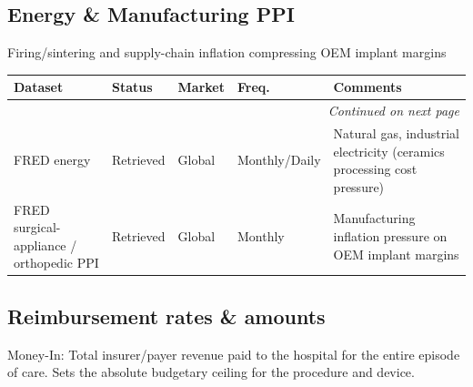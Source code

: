 \documentclass{article}
\begin{document}
\subsection{Energy \& Manufacturing PPI}
Firing/sintering and supply-chain inflation compressing OEM implant margins\\[0.5em]

\small
\setlength{\tabcolsep}{4pt}
\renewcommand{\arraystretch}{1.15}
\begin{longtable}{@{}p{3.0cm}p{2.0cm}p{2.1cm}p{1.9cm}p{5.8cm}@{}}
\toprule
\textbf{Dataset} & \textbf{Status} & \textbf{Market} & \textbf{Freq.} & \textbf{Comments} \\
\midrule
\endhead
\midrule
\multicolumn{5}{r}{\textit{Continued on next page}} \\
\endfoot
\bottomrule
\endlastfoot
FRED energy & \textcolor{green!60!black}{Retrieved} & Global & Monthly/Daily & Natural gas, industrial electricity (ceramics processing cost pressure) \\
FRED surgical-appliance / orthopedic PPI & \textcolor{green!60!black}{Retrieved} & Global & Monthly & Manufacturing inflation pressure on OEM implant margins \\
\end{longtable}
\normalsize

\subsection{Reimbursement rates \& amounts}
Money-In: Total insurer/payer revenue paid to the hospital for the entire episode of care. Sets the absolute budgetary ceiling for the procedure and device.\\[0.5em]
\end{document}
